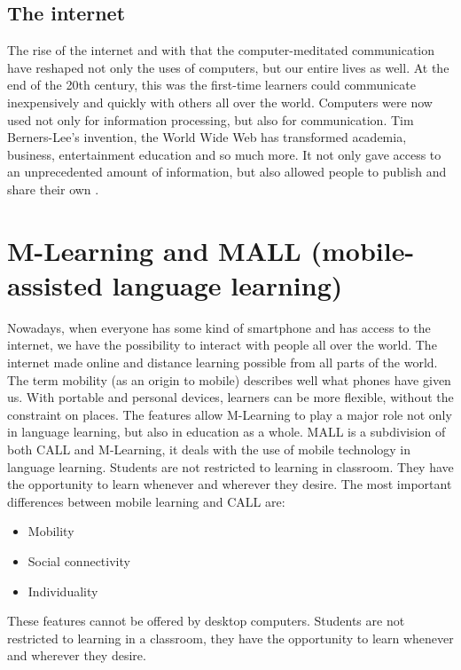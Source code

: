 \documentclass[10pt,english,a4paper]{article}
\begin{document}
\subsection{The internet}
The rise of the internet and with that the computer-meditated communication have reshaped not only the uses of computers, but our entire lives as well. At the end of the 20th century, this was the first-time learners could communicate inexpensively and quickly with others all over the world. Computers were now used not only for information processing, but also for communication. Tim Berners-Lee’s invention, the World Wide Web has transformed academia, business, entertainment education and so much more. It not only gave access to an unprecedented amount of information, but also allowed people to publish and share their own \cite {warschauer1998computers}. 




\section{M-Learning and MALL (mobile-assisted language learning)}

Nowadays, when everyone has some kind of smartphone and has access to the internet, we have the possibility to interact with people all over the world. The internet made online and distance learning possible from all parts of the world. The term mobility (as an origin to mobile) describes well what phones have given us. With portable and personal devices, learners can be more flexible, without the constraint on places. The features allow M-Learning to play a major role not only in language learning, but also in education as a whole.
MALL is a subdivision of both CALL and M-Learning, it deals with the use of mobile technology in language learning. Students are not restricted to learning in classroom. They have the opportunity to learn whenever and wherever they desire. \newline The most important differences between mobile learning and CALL are:

\begin{itemize}
\item Mobility
\item Social connectivity
\item Individuality
\end{itemize}

These features cannot be offered by desktop computers.
Students are not restricted to learning in a classroom, they have the opportunity to learn whenever and wherever they desire. 
\end{document}
